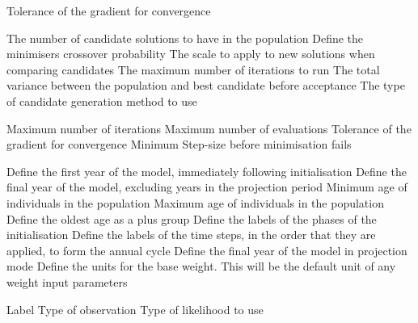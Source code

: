  {Tolerance of the gradient for convergence}
\par\textbf{}\par
\par\textbf{}\par
{} {The number of candidate solutions to have in the population}
 {Define the minimisers crossover probability}
 {The scale to apply to new solutions when comparing candidates}
 {The maximum number of iterations to run}
 {The total variance between the population and best candidate before acceptance}
 {The type of candidate generation method to use}
\par\textbf{}\par
\par\textbf{}\par
{} {Maximum number of iterations}
 {Maximum number of evaluations}
 {Tolerance of the gradient for convergence}
 {Minimum Step-size before minimisation fails}
\par\par
{} {Define the first year of the model, immediately following initialisation}
 {Define the final year of the model, excluding years in the projection period}
 {Minimum age of individuals in the population}
 {Maximum age of individuals in the population}
 {Define the oldest age as a plus group}
 {Define the labels of the phases of the initialisation}
 {Define the labels of the time steps, in the order that they are applied, to form the annual cycle}
 {Define the final year of the model in projection mode}
 {}
 {Define the units for the base weight. This will be the default unit of any weight input parameters}
\par\par
{} {Label}
 {Type of observation}
 {Type of likelihood to use}
